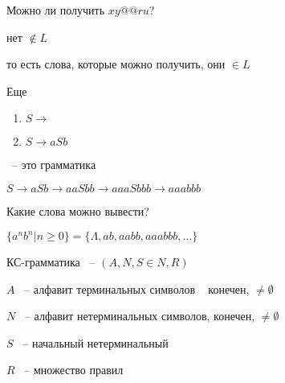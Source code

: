 \documentclass[russian]{lecture-notes}
\begin{document}
    Можно ли получить $xy@@ru$?

    нет $\notin L$

    то есть слова, которые можно получить, они $\in L$

    \begin{example}

        Еще

        \begin{enumerate}
            \item{
                $S \rightarrow$
            }
            \item{
                $S \rightarrow aSb$
            }
        \end{enumerate}

        ~-- это грамматика

        $S \rightarrow aSb \rightarrow aaSbb \rightarrow aaaSbbb \rightarrow aaabbb$

        Какие слова можно вывести?

        $\{ a^n b^n | n \geq 0\} = \{ \Lambda, ab, aabb, aaabbb, \dots  \}$
    \end{example}

    \begin{definition}
        КС-грамматика ~-- $(A, N, S \in N, R)$

        $A$ ~-- алфавит терминальных символов ~ конечен, $\neq \emptyset$

        $N$ ~-- алфавит нетерминальных символов, конечен, $\neq \emptyset$

        $S$ ~-- начальный нетерминальный

        $R$ ~-- множество правил
    \end{definition}
\end{document}

